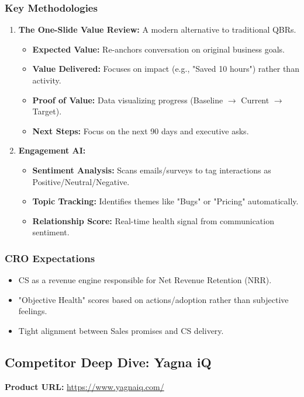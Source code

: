 \documentclass[12pt,a4paper]{article}
\begin{document}
\subsubsection{Key Methodologies}
\begin{enumerate}
    \item \textbf{The One-Slide Value Review:} A modern alternative to traditional QBRs.
    \begin{itemize}
        \item \textbf{Expected Value:} Re-anchors conversation on original business goals.
        \item \textbf{Value Delivered:} Focuses on impact (e.g., "Saved 10 hours") rather than activity.
        \item \textbf{Proof of Value:} Data visualizing progress (Baseline $\rightarrow$ Current $\rightarrow$ Target).
        \item \textbf{Next Steps:} Focus on the next 90 days and executive asks.
    \end{itemize}
    \item \textbf{Engagement AI:}
    \begin{itemize}
        \item \textbf{Sentiment Analysis:} Scans emails/surveys to tag interactions as Positive/Neutral/Negative.
        \item \textbf{Topic Tracking:} Identifies themes like "Bugs" or "Pricing" automatically.
        \item \textbf{Relationship Score:} Real-time health signal from communication sentiment.
    \end{itemize}
\end{enumerate}

\subsubsection{CRO Expectations}
\begin{itemize}
    \item CS as a revenue engine responsible for Net Revenue Retention (NRR).
    \item "Objective Health" scores based on actions/adoption rather than subjective feelings.
    \item Tight alignment between Sales promises and CS delivery.
\end{itemize}

\subsection{Competitor Deep Dive: Yagna iQ}
\textbf{Product URL:} \url{https://www.yagnaiq.com/}
\end{document}
